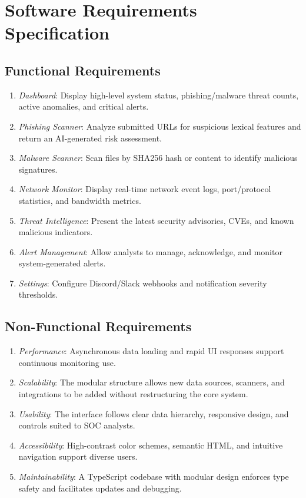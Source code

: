 \documentclass[conference]{IEEEtran}
\begin{document}
\section{Software Requirements Specification}
\subsection{Functional Requirements}
\begin{enumerate}
    \item \textit{Dashboard}: Display high-level system status, phishing/malware threat counts, active anomalies, and critical alerts.
    \item \textit{Phishing Scanner}: Analyze submitted URLs for suspicious lexical features and return an AI-generated risk assessment.
    \item \textit{Malware Scanner}: Scan files by SHA256 hash or content to identify malicious signatures.
    \item \textit{Network Monitor}: Display real-time network event logs, port/protocol statistics, and bandwidth metrics.
    \item \textit{Threat Intelligence}: Present the latest security advisories, CVEs, and known malicious indicators.
    \item \textit{Alert Management}: Allow analysts to manage, acknowledge, and monitor system-generated alerts.
    \item \textit{Settings}: Configure Discord/Slack webhooks and notification severity thresholds.
\end{enumerate}

\subsection{Non-Functional Requirements}
\begin{enumerate}
    \item \textit{Performance}: Asynchronous data loading and rapid UI responses support continuous monitoring use.
    \item \textit{Scalability}: The modular structure allows new data sources, scanners, and integrations to be added without restructuring the core system.
    \item \textit{Usability}: The interface follows clear data hierarchy, responsive design, and controls suited to SOC analysts.
    \item \textit{Accessibility}: High-contrast color schemes, semantic HTML, and intuitive navigation support diverse users.
    \item \textit{Maintainability}: A TypeScript codebase with modular design enforces type safety and facilitates updates and debugging.
\end{enumerate}
\end{document}
